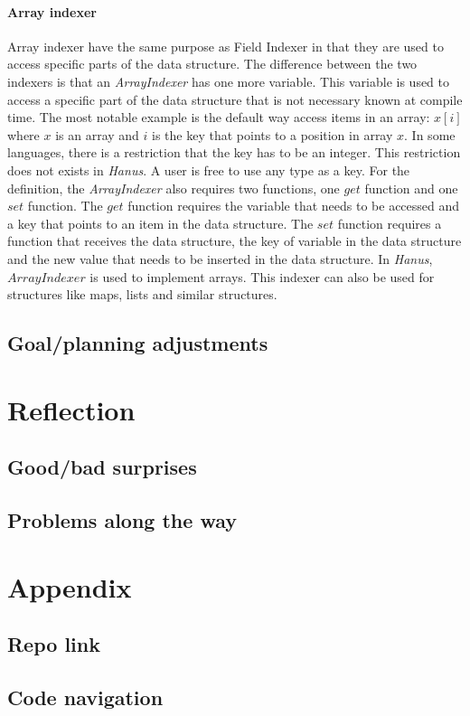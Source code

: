 \documentclass[12pt,a4paper]{article}
\begin{document}
	\paragraph{Array indexer}	
	Array indexer have the same purpose as Field Indexer in that they are used to access specific parts of the data structure. The difference between the two indexers is that an \textit{ArrayIndexer} has one more variable. This variable is used to access a specific part of the data structure that is not necessary known at compile time. The most notable example is the default way access items in an array: $x[i]$ where $x$ is an array and $i$ is the key that points to a position in array $x$. In some languages, there is a restriction that the key has to be an integer. This restriction does not exists in \textit{Hanus}. A user is free to use any type as a key. For the definition, the \textit{ArrayIndexer} also requires two functions, one $get$ function and one $set$ function. The $get$ function requires the variable that needs to be accessed and a key that points to an item in the data structure. The $set$ function requires a function that receives the data structure, the key of variable in the data structure and the new value that needs to be inserted in the data structure. In \textit{Hanus}, $ArrayIndexer$ is used to implement arrays. This indexer can also be used for structures like maps, lists and similar structures. 	
	
	\subsection{Goal/planning adjustments}
\section{Reflection}
	\subsection{Good/bad surprises}
	\subsection{Problems along the way}
\section{Appendix}
	\subsection{Repo link}
	\subsection{Code navigation}

\newpage


\end{document}
